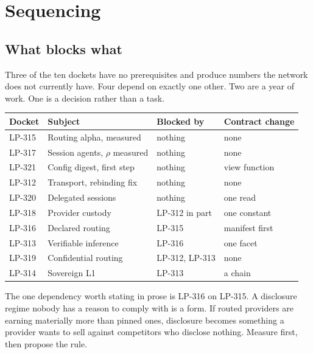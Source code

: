 \documentclass[11pt,a4paper]{article}
\begin{document}
\section{Sequencing}
\label{sec:seq}

\subsection{What blocks what}

Three of the ten dockets have no prerequisites and produce numbers the network
does not currently have. Four depend on exactly one other. Two are a year of
work. One is a decision rather than a task.

\begin{center}
\begin{tabular}{@{}llll@{}}
\toprule
\textbf{Docket} & \textbf{Subject} & \textbf{Blocked by} & \textbf{Contract change} \\
\midrule
LP-315 & Routing alpha, measured        & nothing       & none \\
LP-317 & Session agents, $\rho$ measured & nothing      & none \\
LP-321 & Config digest, first step      & nothing       & view function \\
LP-312 & Transport, rebinding fix       & nothing       & none \\
LP-320 & Delegated sessions             & nothing       & one read \\
LP-318 & Provider custody               & LP-312 in part & one constant \\
LP-316 & Declared routing               & LP-315        & manifest first \\
LP-313 & Verifiable inference           & LP-316        & one facet \\
LP-319 & Confidential routing           & LP-312, LP-313 & none \\
LP-314 & Sovereign L1                   & LP-313        & a chain \\
\bottomrule
\end{tabular}
\end{center}

The one dependency worth stating in prose is LP-316 on LP-315. A disclosure
regime nobody has a reason to comply with is a form. If routed providers are
earning materially more than pinned ones, disclosure becomes something a
provider wants to sell against competitors who disclose nothing. Measure first,
then propose the rule.
\end{document}
